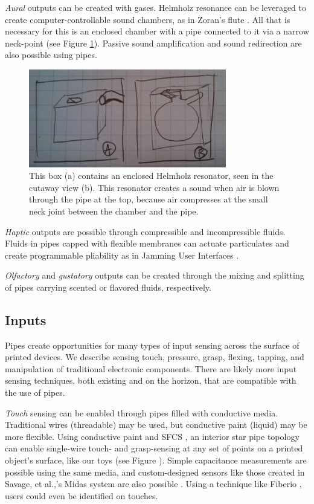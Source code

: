 \emph{Aural} outputs can be created with gases.  Helmholz resonance can be leveraged to create computer-controllable sound chambers, as in Zoran's flute \cite{Zoran-flute}.  All that is necessary for this is an enclosed chamber with a pipe connected to it via a narrow neck-point (see Figure \ref{fig:ocarina}).  Passive sound amplification and sound redirection are also possible using pipes.

\begin{figure}[h]
\centering
    \includegraphics[width=3.4in]{figures/placeholder/helmholz.jpg}
\caption{This box (a) contains an enclosed Helmholz resonator, seen in the cutaway view (b).  This resonator creates a sound when air is blown through the pipe at the top, because air compresses at the small neck joint between the chamber and the pipe.  }
\label{fig:ocarina}
\end{figure}

\emph{Haptic} outputs are possible through compressible and incompressible fluids.  Fluids in pipes capped with flexible membranes can actuate particulates and create programmable pliability as in Jamming User Interfaces \cite{Follmer-jamming}.

\emph{Olfactory} and \emph{gustatory} outputs can be created through the mixing and splitting of pipes carrying scented or flavored fluids, respectively.

\subsection{Inputs}

Pipes create opportunities for many types of input sensing across the surface of printed devices.  We describe sensing touch, pressure, grasp, flexing, tapping, and manipulation of traditional electronic components.  There are likely more input sensing techniques, both existing and on the horizon, that are compatible with the use of pipes.

\emph{Touch} sensing can be enabled through pipes filled with conductive media.  Traditional wires (threadable) may be used, but conductive paint (liquid) may be more flexible.  Using conductive paint and SFCS \cite{Sato-touche}, an interior star pipe topology can enable single-wire touch- and grasp-sensing at any set of points on a printed object's surface, like our toys (see Figure \cite{fig:toys}).  Simple capacitance measurements are possible using the same media, and custom-designed sensors like those created in Savage, et al.,'s Midas system are also possible \cite{Savage-midas}.  Using a technique like Fiberio \cite{Holz-fiberio}, users could even be identified on touches.

